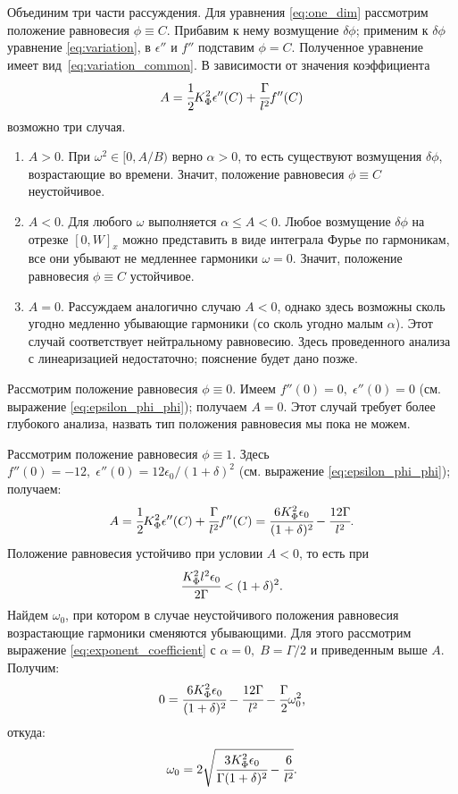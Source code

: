 Объединим три части рассуждения. Для уравнения \eqref{eq:one_dim} рассмотрим положение равновесия $\phi \equiv C$. Прибавим к нему возмущение $\delta \phi$; применим к $\delta \phi$ уравнение \eqref{eq:variation}, в $\epsilon''$ и $f''$ подставим $\phi = C$. Полученное уравнение имеет вид~\eqref{eq:variation_common}. В зависимости от значения коэффициента
$$A = \cfrac{1}{2} K_\Phi^2 \epsilon''(C) + \cfrac{\Gamma}{l^2} f''(C)$$
возможно три случая.
\begin{enumerate}[label=\arabic*.]
	\item $A > 0$. При $\omega^2 \in [0, A / B)$ верно $\alpha > 0$, то есть существуют возмущения $\delta \phi$, возрастающие во времени. Значит, положение равновесия $\phi \equiv C$ неустойчивое.
	\item $A < 0$. Для любого $\omega$ выполняется $\alpha \leqslant A < 0$. Любое возмущение $\delta \phi$ на отрезке $[0, W]_x$ можно представить в виде интеграла Фурье по гармоникам, все они убывают не медленнее гармоники $\omega = 0$. Значит, положение равновесия $\phi \equiv C$ устойчивое.
	\item $A = 0$. Рассуждаем аналогично случаю $A < 0$, однако здесь возможны сколь угодно медленно убывающие гармоники (со сколь угодно малым $\alpha$). Этот случай соответствует нейтральному равновесию. Здесь проведенного анализа с линеаризацией недостаточно; пояснение будет дано позже.
\end{enumerate}

Рассмотрим положение равновесия $\phi \equiv 0$. Имеем $f''(0) = 0, \; \epsilon''(0) = 0$ (см. выражение \eqref{eq:epsilon_phi_phi}); получаем $A = 0$. Этот случай требует более глубокого анализа, назвать тип положения равновесия мы пока не можем.

Рассмотрим положение равновесия $\phi \equiv 1$. Здесь $f''(0) = -12, \; \epsilon''(0) = 12 \epsilon_0 / (1 + \delta)^2$ (см. выражение \eqref{eq:epsilon_phi_phi}); получаем:
$$A = \cfrac{1}{2} K_\Phi^2 \epsilon''(C) + \cfrac{\Gamma}{l^2} f''(C) = \cfrac{6 K_\Phi^2 \epsilon_0}{(1 + \delta)^2} - \cfrac{12 \Gamma}{l^2} {\text{.}}$$
Положение равновесия устойчиво при условии $A < 0$, то есть при
\begin{equation}
	\cfrac{K_\Phi^2 l^2 \epsilon_0}{2 \Gamma} < (1 + \delta)^2 {\text{.}}
	\label{cond:equilibrium_1_stable}
\end{equation}
Найдем $\omega_0$, при котором в случае неустойчивого положения равновесия возрастающие гармоники сменяются убывающими. Для этого рассмотрим выражение \eqref{eq:exponent_coefficient} с $\alpha = 0, \; B = \Gamma / 2$ и приведенным выше $A$. Получим:
$$0 = \cfrac{6 K_\Phi^2 \epsilon_0}{(1 + \delta)^2} - \cfrac{12 \Gamma}{l^2} - \cfrac{\Gamma}{2} \omega_0^2 {\text{,}}$$
откуда:
$$\omega_0 = 2 \sqrt{\cfrac{3 K_\Phi^2 \epsilon_0}{\Gamma (1 + \delta)^2} - \cfrac{6}{l^2}} {\text{.}}$$

